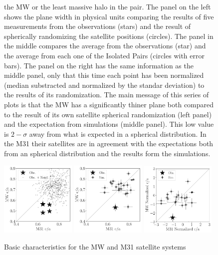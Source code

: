 \documentclass[a4paper,fleqn,usenatbib]{mnras}
\begin{document}
\begin{figure}
{  the MW or the least massive halo in the pair.
The panel on the left shows the plane width in physical units
comparing the results of five measurements from the observations
(stars) and the result of spherically randomizing the satellite
positions (circles). 
The panel in the middle compares the average from the observations
(star) and the average from each one of the Isolated Pairs (circles
with error bars).
The panel on the right has the same information as the middle panel,
only that this time each point has been normalized (median substracted
and normalized by the standar deviation) to the results of its
randomization. 
The main message of this series of plots is that the MW has a
significantly thiner plane both compared to the result of its own
satellite spherical randomization (left panel) and the expectation from
simulations (middle panel). 
This low value is $2-\sigma$ away from what is expected in a spherical
distribution. 
In the M31 their satellites are in agreement with the expectations
both from an spherical distribution and the results form the
simulations. 
\label{fig:lg_scatter}}
\end{figure}

\begin{figure}
\centering
\includegraphics[width=0.32\textwidth]{scatter_random_ranked_ca_ratio.pdf}
\includegraphics[width=0.32\textwidth]{scatter_ranked_ca_ratio.pdf}
\includegraphics[width=0.32\textwidth]{scatter_norm_ca_ratio.pdf}
\caption{Basic characteristics for the MW and M31 satellite systems
\label{fig:lg_scatter}}
\end{figure}
\end{document}
